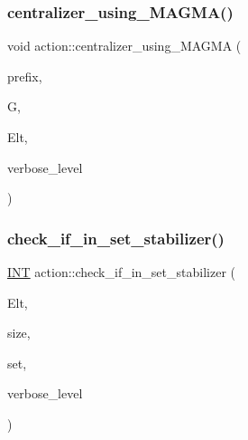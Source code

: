\mbox{\label{classaction_a9f6d62cd7a30b0c159ff0df8a1d596ed}} 
\subsubsection{\texorpdfstring{centralizer\+\_\+using\+\_\+\+M\+A\+G\+M\+A()}{centralizer\_using\_MAGMA()}}
{\footnotesize\ttfamily void action\+::centralizer\+\_\+using\+\_\+\+M\+A\+G\+MA (\begin{DoxyParamCaption}\item[{const \mbox{\hyperlink{galois_8h_ab6cc7b4aeb6ea31aba2b3fbfc83ff5e6}{B\+Y\+TE}} $\ast$}]{prefix,  }\item[{\mbox{\hyperlink{classsims}{sims}} $\ast$}]{G,  }\item[{\mbox{\hyperlink{galois_8h_a09fddde158a3a20bd2dcadb609de11dc}{I\+NT}} $\ast$}]{Elt,  }\item[{\mbox{\hyperlink{galois_8h_a09fddde158a3a20bd2dcadb609de11dc}{I\+NT}}}]{verbose\+\_\+level }\end{DoxyParamCaption})}

\mbox{\label{classaction_a28a33753a386a8bb650b93035eb9fa14}} 
\subsubsection{\texorpdfstring{check\+\_\+if\+\_\+in\+\_\+set\+\_\+stabilizer()}{check\_if\_in\_set\_stabilizer()}}
{\footnotesize\ttfamily \mbox{\hyperlink{galois_8h_a09fddde158a3a20bd2dcadb609de11dc}{I\+NT}} action\+::check\+\_\+if\+\_\+in\+\_\+set\+\_\+stabilizer (\begin{DoxyParamCaption}\item[{\mbox{\hyperlink{galois_8h_a09fddde158a3a20bd2dcadb609de11dc}{I\+NT}} $\ast$}]{Elt,  }\item[{\mbox{\hyperlink{galois_8h_a09fddde158a3a20bd2dcadb609de11dc}{I\+NT}}}]{size,  }\item[{\mbox{\hyperlink{galois_8h_a09fddde158a3a20bd2dcadb609de11dc}{I\+NT}} $\ast$}]{set,  }\item[{\mbox{\hyperlink{galois_8h_a09fddde158a3a20bd2dcadb609de11dc}{I\+NT}}}]{verbose\+\_\+level }\end{DoxyParamCaption})}

